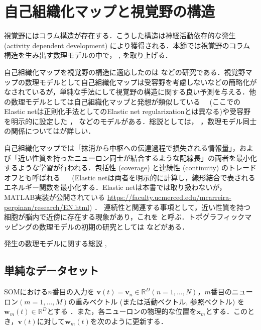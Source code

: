 \section{自己組織化マップと視覚野の構造}
視覚野にはコラム構造が存在する．こうした構造は神経活動依存的な発生  (activity dependent development) により獲得される．本節では視覚野のコラム構造を生み出す数理モデルの中で，\textbf{} \cite{Kohonen1982-mn}, \cite{Kohonen2013-yt}を取り上げる．

自己組織化マップを視覚野の構造に適応したのは\cite{Obermayer1990-gq} \cite{N_V_Swindale1998-ri}などの研究である．視覚野マップの数理モデルとして自己組織化マップは受容野を考慮しないなどの簡略化がなされているが，単純な手法にして視覚野の構造に関する良い予測を与える．他の数理モデルとしては自己組織化マップと発想が類似している \textbf{}  \cite{Durbin1987-bp} \cite{Durbin1990-xx} \cite{Carreira-Perpinan2005-gy}　(ここでのElastic netは正則化手法としてのElastic net regularizationとは異なる)や受容野を明示的に設定した \cite{Tanaka2004-vz}， \cite{Ringach2007-oe}などのモデルがある．総説としては\cite{Das2005-mq}，\cite{Goodhill2007-va} ，数理モデル同士の関係については\cite{2002-nm}が詳しい．

自己組織化マップでは「抹消から中枢への伝達過程で損失される情報量」，および「近い性質を持ったニューロン同士が結合するような配線長」の両者を最小化するような学習が行われる．包括性 (coverage) と連続性 (continuity) のトレードオフとも呼ばれる \cite{Carreira-Perpinan2005-gy}　 (Elastic netは両者を明示的に計算し，線形結合で表されるエネルギー関数を最小化する．Elastic netは本書では取り扱わないが，MATLAB実装が公開されている
\url{https://faculty.ucmerced.edu/mcarreira-perpinan/research/EN.html}) ． 連続性と関連する事項として，近い性質を持つ細胞が脳内で近傍に存在する現象があり，これを\textbf{} と呼ぶ．トポグラフィックマッピングの数理モデルの初期の研究としては\cite{Von_der_Malsburg1973-bz} \cite{Willshaw1976-zo} \cite{Takeuchi1979-mi}などがある．

発生の数理モデルに関する総説 \cite{Van_Ooyen2011-fz}, \cite{Goodhill2018-ho}
\subsection{単純なデータセット}
SOMにおける$n$番目の入力を $\mathbf{v}(t)=\mathbf{v}_n\in \mathbb{R}^{D} (n=1, \ldots, N)$，$m$番目のニューロン$ (m=1, \ldots, M) $の重みベクトル (または活動ベクトル, 参照ベクトル) を$\mathbf{w}_m(t)\in \mathbb{R}^{D}$とする \cite{Kohonen2013-yt}．また，各ニューロンの物理的な位置を$\mathbf{x}_m$とする．このとき，$\mathbf{v}(t)$に対して$\mathbf{w}_m(t)$を次のように更新する．

